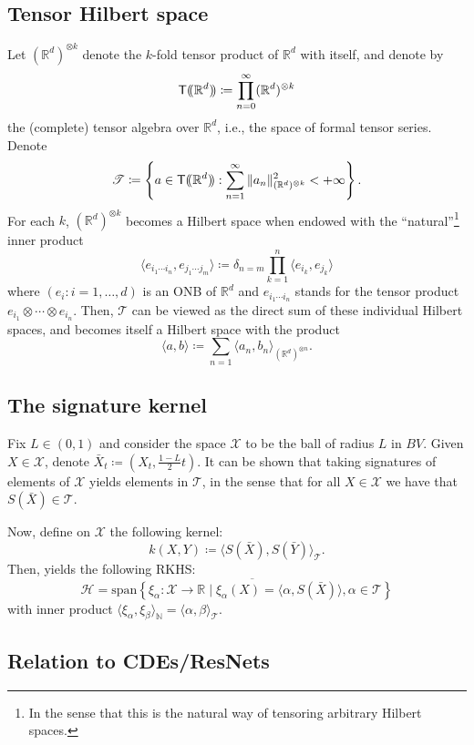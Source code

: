 \documentclass[10pt, reqno]{article}
\theoremstyle{definition}
\theoremstyle{plain}
\newcommand{\R}{\mathbb{R}}
\newcommand{\T}{\mathscr{T}}
\newcommand{\N}{\mathbb{N}}
\newcommand{\X}{\mathscr{X}}
\renewcommand{\H}{\mathscr{H}}
\DeclarePairedDelimiter{\dpar}{(\mkern-4mu(}{)\mkern-3.5mu)}
\begin{document}
\subsection{Tensor Hilbert space}
Let \((\R^d)^{\otimes k}\) denote the \(k\)-fold tensor product of \(\R^d\) with itself, and denote by
\[
	\mathsf{T}\dpar{\R^d}\coloneqq\prod_{n=0}^\infty( \R^d )^{\otimes k}
\]
the (complete) tensor algebra over \(\R^d\), i.e., the space of formal tensor series.
Denote
\[
	\T\coloneqq\left\{ a\in\mathsf{T}\dpar{\R^d}:\sum_{n=1}^{\infty}\|a_n\|^2_{(\R^d)^{\otimes k}}<+\infty\right\}.
\]
For each \(k\), \((\R^d)^{\otimes k}\) becomes a Hilbert space when endowed with the ``natural''\footnote{In the sense that this is the natural way of
tensoring arbitrary Hilbert spaces.} inner product
\[
	\langle e_{i_1\dotsm i_n},e_{j_1\dotsm j_m}\rangle\coloneqq\delta_{n=m}\prod_{k=1}^n\langle e_{i_k},e_{j_k}\rangle
\]
where \((e_{i}:i=1,\dotsc,d)\) is an ONB of \(\R^d\) and \(e_{i_1\dotsm i_n}\) stands for the tensor product \(e_{i_1}\otimes\dotsm\otimes
e_{i_n}\).
Then, \(\T\) can be viewed as the direct sum of these individual Hilbert spaces, and becomes itself a Hilbert space with the product
\[
	\langle a,b\rangle\coloneqq\sum_{n=1}\langle a_n,b_n\rangle_{(\R^d)^{\otimes n}}.
\]

\subsection{The signature kernel}
Fix \(L\in (0,1)\) and consider the space \(\X\) to be the ball of radius \(L\) in \(BV\).
Given \(X\in\X\), denote \(\bar{X}_t\coloneqq(X_t,\tfrac{1-L}{2}t)\).
It can be shown that taking signatures of elements of \(\X\) yields elements in \(\T\), in the sense that for all
\(X\in\X\) we have that \(S(\bar X)\in\T\).

Now, define on \(\X\) the following kernel:
\[
	k(X,Y)\coloneqq\langle S(\bar X),S(\bar Y)\rangle_{\T}.
\]
Then,  yields the following RKHS:
\[
	\H=\overline{\mathrm{span}\left\{ \xi_\alpha\colon\X\to\R\mid\xi_\alpha(X)=\langle \alpha,S(\bar X)\rangle,\alpha\in\T \right\}}
\]
with inner product \(\langle\xi_\alpha,\xi_\beta\rangle_{\N}=\langle \alpha,\beta\rangle_{\T}.\)

\subsection{Relation to CDEs/ResNets}
\end{document}
